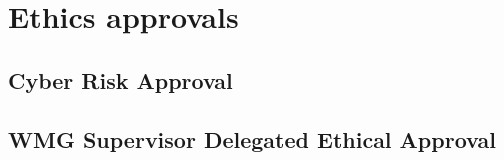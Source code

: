 \chapter{Ethics approvals}

\section{Cyber Risk Approval}



\section{WMG Supervisor Delegated Ethical Approval}

